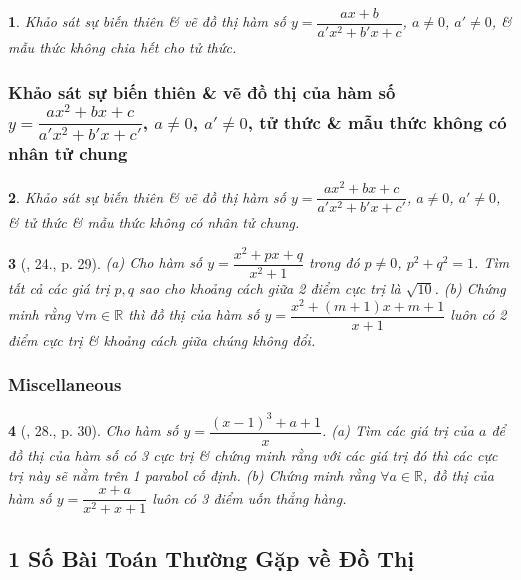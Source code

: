 \documentclass{article}
\newtheorem{baitoan}{}
\begin{document}
\begin{baitoan}
	Khảo sát sự biến thiên \& vẽ đồ thị hàm số $y = \dfrac{ax + b}{a'x^2 + b'x + c}$, $a\ne 0$, $a'\ne 0$, \& mẫu thức không chia hết cho tử thức.
\end{baitoan}

\subsubsection{Khảo sát sự biến thiên \& vẽ đồ thị của hàm số $y = \dfrac{ax^2 + bx + c}{a'x^2 + b'x + c'}$, $a\ne 0$, $a'\ne 0$, tử thức \& mẫu thức không có nhân tử chung}

\begin{baitoan}
	Khảo sát sự biến thiên \& vẽ đồ thị hàm số $y = \dfrac{ax^2 + bx + c}{a'x^2 + b'x + c'}$, $a\ne 0$, $a'\ne 0$, \& tử thức \& mẫu thức không có nhân tử chung.
\end{baitoan}

\begin{baitoan}[\cite{TLCT_giai_tich_12}, 24., p. 29]
	(a) Cho hàm số $y = \dfrac{x^2 + px + q}{x^2 + 1}$ trong đó $p\ne 0$, $p^2 + q^2 = 1$. Tìm tất cả các giá trị $p,q$ sao cho khoảng cách giữa 2 điểm cực trị là $\sqrt{10}$. (b) Chứng minh rằng $\forall m\in\mathbb{R}$ thì đồ thị của hàm số $y = \dfrac{x^2 + (m + 1)x + m + 1}{x + 1}$ luôn có 2 điểm cực trị \& khoảng cách giữa chúng không đổi.	
\end{baitoan}

\subsubsection{Miscellaneous}

\begin{baitoan}[\cite{TLCT_giai_tich_12}, 28., p. 30]
	Cho hàm số $y = \dfrac{(x - 1)^3 + a + 1}{x}$. (a) Tìm các giá trị của $a$ để đồ thị của hàm số có 3 cực trị \& chứng minh rằng với các giá trị đó thì các cực trị này sẽ nằm trên 1 parabol cố định. (b) Chứng minh rằng $\forall a\in\mathbb{R}$, đồ thị của hàm số $y = \dfrac{x + a}{x^2 + x + 1}$ luôn có 3 điểm uốn thẳng hàng.	
\end{baitoan}


\subsection{1 Số Bài Toán Thường Gặp về Đồ Thị}
\end{document}

